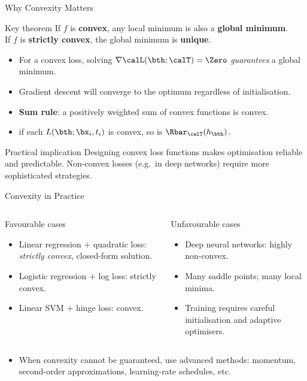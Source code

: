 \begin{frame}{Why Convexity Matters}
  \begin{alertblock}{Key theorem}
    If $f$ is \textbf{convex}, any local minimum is also a \textbf{global minimum}.\\
    If $f$ is \textbf{strictly convex}, the global minimum is \textbf{unique}.
  \end{alertblock}
  \vspace{6pt}
  \begin{itemize}
    \item For a convex loss, solving $\nabla\calL(\bth;\calT)=\Zero$ \emph{guarantees} a global minimum.
    \item Gradient descent will converge to the optimum regardless of initialisation.
    \item \textbf{Sum rule}: a positively weighted sum of convex functions is convex.
    \item[$\Rightarrow$] if each $L(\bth;\bx_i,t_i)$ is convex, so is $\Rbar_{\calT}(h_{\bth})$.
  \end{itemize}
  \begin{block}{Practical implication}
    Designing convex loss functions makes optimisation reliable and predictable.
    Non-convex losses (e.g.\ in deep networks) require more sophisticated strategies.
  \end{block}
\end{frame}

\begin{frame}{Convexity in Practice}
  \begin{columns}[t]
      \begin{block}{Favourable cases}
        \begin{itemize}
          \item Linear regression $+$ quadratic loss: \emph{strictly convex}, closed-form solution.
          \item Logistic regression $+$ log loss: strictly convex.
          \item Linear SVM $+$ hinge loss: convex.
        \end{itemize}
      \end{block}
      \begin{alertblock}{Unfavourable cases}
        \begin{itemize}
          \item Deep neural networks: highly non-convex.
          \item Many saddle points; many local minima.
          \item Training requires careful initialisation and adaptive optimisers.
        \end{itemize}
      \end{alertblock}
  \end{columns}
  \vspace{6pt}
  \begin{itemize}
    \item When convexity cannot be guaranteed, use advanced methods:
          momentum, second-order approximations, learning-rate schedules, etc.
  \end{itemize}
\end{frame}


